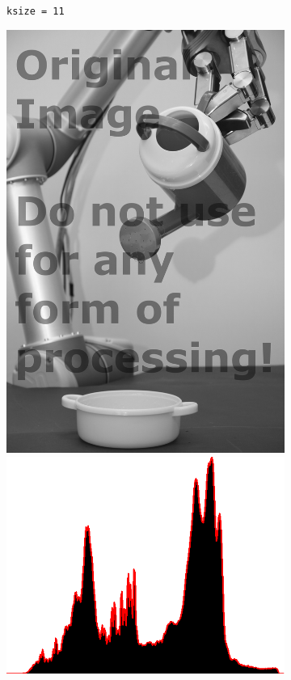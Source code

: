 \begin{figure}[H]
\begin{subfigure}[b]{0.3\textwidth}
        \caption{\lstinline|ksize = 11|}
        \label{fig:img2_kernel11}
    \end{subfigure}
    \begin{subfigure}[b]{0.3\textwidth}
        \includegraphics[width=\textwidth]{org.png}\\[0.1cm]
        \includegraphics[width=\textwidth]{histOrg.png}

\end{subfigure}
\end{figure}
